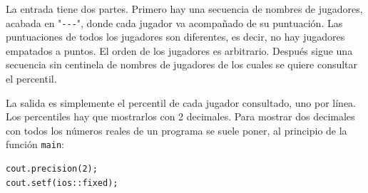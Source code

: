 \Input

La entrada tiene dos partes. Primero hay una secuencia de nombres de jugadores, acabada en "\verb|---|", donde cada jugador va acompañado de su puntuación. Las puntuaciones de todos los jugadores son diferentes, es decir, no hay jugadores empatados a puntos. El orden de los jugadores es arbitrario. Después sigue una secuencia sin centinela de nombres de jugadores de los cuales se quiere consultar el percentil.

\Output

La salida es simplemente el percentil de cada jugador consultado, uno por línea. Los percentiles hay que mostrarlos con 2 decimales. Para mostrar dos decimales con todos los números reales de un programa se suele poner, al principio de la función \verb|main|:

\begin{verbatim}
cout.precision(2);
cout.setf(ios::fixed);
\end{verbatim}

\SampleTwoCol
